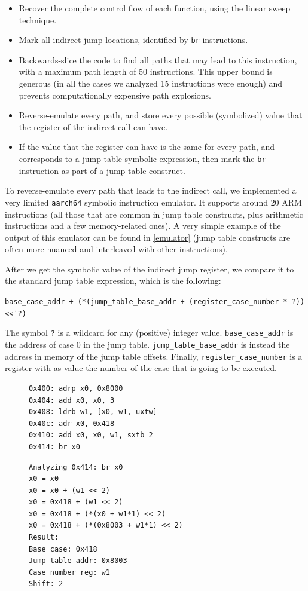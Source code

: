 \documentclass[a4paper,11pt,oneside]{report}
\begin{document}
\begin{itemize}
	\item Recover the complete control flow of each function, using the linear sweep technique.
	\item Mark all indirect jump locations, identified by \texttt{br} instructions.
	\item Backwards-slice the code to find all paths that may lead to
		this instruction, with a maximum path length of 50 instructions. This upper bound is generous (in all the cases we analyzed 15 instructions were enough) and prevents computationally expensive path explosions.
	\item Reverse-emulate every path, and store every possible (symbolized)
		value that the register of the indirect call can have.
	\item If the value that the register can have is the same for every path,
		and corresponds to a jump table symbolic expression, then mark the
		\texttt{br} instruction as part of a jump table construct.
\end{itemize}

To reverse-emulate every path that leads to the indirect call, we implemented a
very limited \texttt{aarch64} symbolic instruction emulator. It supports around
20 ARM instructions (all those that are common in jump table constructs, plus
arithmetic instructions and a few memory-related ones).  A very simple example of the
output of this emulator can be found in \autoref{emulator} (jump table constructs are 
often more nuanced and interleaved with other instructions).

After we get the symbolic value of the indirect jump register, we compare it to
the standard jump table expression, which is the following:

\texttt{base\_case\_addr + (*(jump\_table\_base\_addr + (register\_case\_number * ?)) \textless\.\textless\  ?)} 

The symbol \texttt{?} is a wildcard for any (positive) integer value.
\texttt{base\_case\_addr} is the address of case 0 in the jump table.
\texttt{jump\_table\_base\_addr} is instead the address in memory of the jump
table offsets. Finally, \texttt{register\_case\_number} is a register with as
value the number of the case that is going to be executed. 


\begin{figure}[h]
\begin{lstlisting}[basicstyle=\ttfamily\small,numbers=none]
0x400: adrp x0, 0x8000
0x404: add x0, x0, 3
0x408: ldrb w1, [x0, w1, uxtw]
0x40c: adr x0, 0x418
0x410: add x0, x0, w1, sxtb 2
0x414: br x0
\end{lstlisting}
\begin{lstlisting}[basicstyle=\ttfamily\small,numbers=none]
Analyzing 0x414: br x0
x0 = x0
x0 = x0 + (w1 << 2)
x0 = 0x418 + (w1 << 2)
x0 = 0x418 + (*(x0 + w1*1) << 2)
x0 = 0x418 + (*(0x8003 + w1*1) << 2)
Result:
Base case: 0x418
Jump table addr: 0x8003
Case number reg: w1
Shift: 2
\end{lstlisting}
\label{emulator}
\end{figure}
\end{document}
